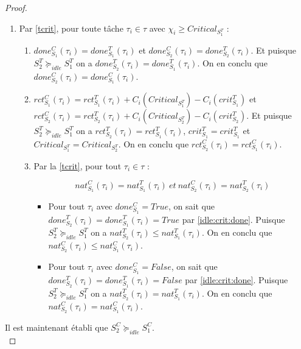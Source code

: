 \documentclass[11pt,a4paper,oneside]{book}
\theoremstyle{break}
\theoremstyle{breakplain}
\begin{document}
\begin{proof}
\begin{enumerate}
\item Par \autoref{tcrit}, pour toute tâche $\tau_i \in \tau$ avec $\chi_i \geq Critical_{S_1^T}$ :
\begin{enumerate}[label=(\alph*)]

\item \label{idle:crit:done} $done_{S_1}^C(\tau_i) = done_{S_1}^T(\tau_i)$ et $done_{S_2}^C(\tau_i) = done_{S_2}^T(\tau_i)$. Et puisque $S^T_2 \succeq_{idle} S^T_1$ on a $done_{S_2}^T(\tau_i)= done_{S_1}^T(\tau_i)$. On en conclu que $done_{S_2}^C(\tau_i) = done_{S_1}^C(\tau_i)$.


\item $rct_{S_1}^C(\tau_i) = rct_{S_1}^T(\tau_i)+C_i(Critical_{S_1^T})-C_i(crit_{S_1}^T)$ et $rct_{S_2}^C(\tau_i) = rct_{S_2}^T(\tau_i)+C_i(Critical_{S_2^T})-C_i(crit_{S_2}^T)$. Et puisque $S^T_2 \succeq_{idle} S^T_1$ on a $rct_{S_2}^T(\tau_i) = rct_{S_1}^T(\tau_i)$, $crit_{S_1}^T = crit_{S_1}^T$ et $Critical_{S_1^T} = Critical_{S_2^T}$. On en conclu que $rct_{S_2}^C(\tau_i) = rct_{S_1}^C(\tau_i)$.



\item Par la \autoref{tcrit}, pour tout $\tau_i \in \tau$ :

\begin{equation}
nat_{S_1}^C(\tau_i) = nat_{S_1}^T(\tau_i)\ et\ nat_{S_2}^C(\tau_i) = nat_{S_2}^T(\tau_i)
\end{equation}

\begin{itemize}

\item Pour tout $\tau_i$ avec $done^C_{S_1} = True$, on sait que $done_{S_2}^T(\tau_i) = done_{S_1}^T(\tau_i) = True$ par \autoref{idle:crit:done}. Puisque $S^T_2 \succeq_{idle} S^T_1$ on a $nat_{S_2}^T(\tau_i)\leq nat_{S_1}^T(\tau_i)$. On en conclu que $nat_{S_2}^C(\tau_i) \leq nat_{S_1}^C(\tau_i)$.

\item Pour tout $\tau_i$ avec $done^C_{S_1} = False$, on sait que $done_{S_2}^T(\tau_i) = done_{S_1}^T(\tau_i) = False$ par \autoref{idle:crit:done}. Puisque $S^T_2 \succeq_{idle} S^T_1$ on a $nat_{S_2}^T(\tau_i) = nat_{S_1}^T(\tau_i)$. On en conclu que $nat_{S_2}^C(\tau_i) = nat_{S_1}^C(\tau_i)$.

\end{itemize}

\end{enumerate}

\end{enumerate}
Il est maintenant établi que $S^C_2 \succeq_{idle} S^C_1$.\\


\end{proof}
\end{document}
